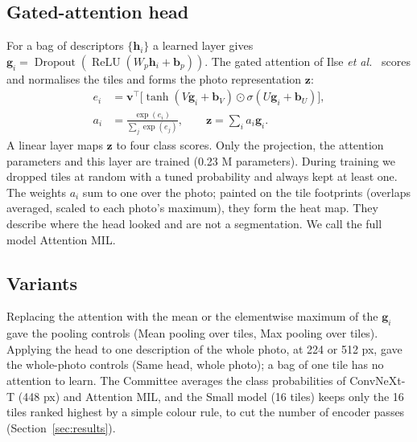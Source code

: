 \subsection{Gated-attention head}
For a bag of descriptors $\{\mathbf h_i\}$ a learned layer gives
$\mathbf g_i=\operatorname{Dropout}(\operatorname{ReLU}(W_p\mathbf h_i+\mathbf b_p))$. The gated attention of Ilse
\textit{et al.}\ \cite{ilse2018} scores and normalises the tiles and forms the photo representation $\mathbf z$:
\begin{align}
 e_i &= \mathbf v^{\top}\bigl[\tanh(V\mathbf g_i+\mathbf b_V)\odot\sigma(U\mathbf g_i+\mathbf b_U)\bigr],\\
 a_i &= \frac{\exp(e_i)}{\sum_j\exp(e_j)},\qquad
 \mathbf z=\sum_i a_i\mathbf g_i .
\end{align}
A linear layer maps $\mathbf z$ to four class scores. Only the projection, the attention parameters and this layer are
trained (0.23 M parameters). During training we dropped tiles at random with a tuned probability and always kept at
least one. The weights $a_i$ sum to one over the photo; painted on the tile footprints (overlaps averaged, scaled to
each photo's maximum), they form the heat map. They describe where the head looked and are not a segmentation. We call the full model Attention MIL.

\subsection{Variants}
Replacing the attention with the mean or the elementwise maximum of the $\mathbf g_i$ gave the pooling controls
(Mean pooling over tiles, Max pooling over tiles). Applying the head to one description of the whole photo, at 224 or
512 px, gave the whole-photo controls (Same head, whole photo); a bag of one tile has no attention to learn. The
Committee averages the class probabilities of ConvNeXt-T (448 px) and Attention MIL, and the Small model (16 tiles) keeps only the 16 tiles ranked
highest by a simple colour rule, to cut the number of encoder passes (Section~\ref{sec:results}).
